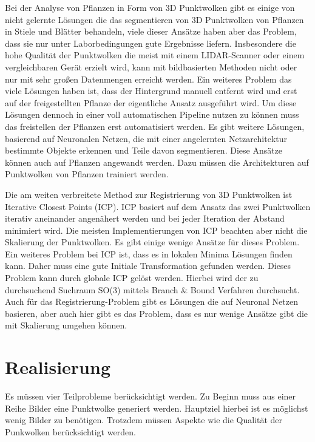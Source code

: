 \documentclass[12pt,titlepage,twoside]{article}
\begin{document}
Bei der Analyse von Pflanzen in Form von 3D Punktwolken gibt es einige von nicht gelernte Lösungen die das segmentieren von 3D Punktwolken von Pflanzen in Stiele und Blätter behandeln, viele dieser Ansätze haben aber das Problem, dass sie nur unter Laborbedingungen gute Ergebnisse liefern. 
Insbesondere die hohe Qualität der Punktwolken die meist mit einem LIDAR-Scanner oder einem vergleichbaren Gerät erzielt wird, kann mit bildbasierten Methoden nicht oder nur mit sehr großen Datenmengen erreicht werden. 
Ein weiteres Problem das viele Lösungen haben ist, dass der Hintergrund manuell entfernt wird und erst auf der freigestellten Pflanze der eigentliche Ansatz ausgeführt wird. 
Um diese Lösungen dennoch in einer voll automatischen Pipeline nutzen zu können muss das freistellen der Pflanzen erst automatisiert werden.
Es gibt weitere Lösungen, basierend auf Neuronalen Netzen, die mit einer angelernten Netzarchitektur bestimmte Objekte erkennen und Teile davon segmentieren. Diese Ansätze können auch auf Pflanzen angewandt werden. Dazu müssen die Architekturen auf Punktwolken von Pflanzen trainiert werden.  

Die am weiten verbreitete Method zur Registrierung von 3D Punktwolken ist Iterative Closest Points (ICP). ICP basiert auf dem Ansatz das zwei Punktwolken iterativ aneinander angenähert werden und bei jeder Iteration der Abstand minimiert wird.
Die meisten Implementierungen von ICP beachten aber nicht die Skalierung der Punktwolken. Es gibt einige wenige Ansätze für dieses Problem. 
Ein weiteres Problem bei ICP ist, dass es in lokalen Minima Lösungen finden kann. Daher muss eine gute Initiale Transformation gefunden werden. Dieses Problem kann durch globale ICP gelöst werden. Hierbei wird der zu durchsuchend Suchraum SO(3) mittels Branch \& Bound Verfahren durchsucht.
Auch für das Registrierung-Problem gibt es Lösungen die auf Neuronal Netzen basieren, aber auch hier gibt es das Problem, dass es nur wenige Ansätze gibt die mit Skalierung umgehen können.

\newpage
\section{Realisierung}
\label{sec:realisierung}
Es müssen vier Teilprobleme berücksichtigt werden. Zu Beginn muss aus einer Reihe Bilder eine Punktwolke generiert werden. Hauptziel hierbei ist es möglichst wenig Bilder zu benötigen. 
Trotzdem müssen Aspekte wie die Qualität der Punkwolken berücksichtigt werden. 
\end{document}
